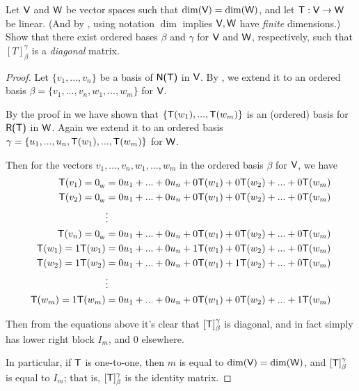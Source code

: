 \begin{exercise} \label{exercise 2.2.17}
Let \(\textsf{V}\) and \(\textsf{W}\) be vector spaces such that \(\dim(\textsf{V}) = \dim(\textsf{W})\), and let \(\textsf{T} : \textsf{V} \to \textsf{W}\) be linear.
(And by , using notation \(\dim\) implies \(\textsf{V}, \textsf{W}\) have \emph{finite} dimensions.)
Show that there exist ordered bases \(\beta\) and \(\gamma\) for
\(\textsf{V}\) and \(\textsf{W}\), respectively, such that \([T]_{\beta}^{\gamma}\) is a \emph{diagonal} matrix.
\end{exercise}

\begin{proof}
Let \(\{ v_1, ..., v_n \}\) be a basis of \(\textsf{N(T)}\) in \(\textsf{V}\).
By , we extend it to an ordered basis \(\beta = \{ v_1, ..., v_n, w_1, ..., w_m \}\) for \(\textsf{V}\).

By the proof in  we have shown that \(\{ \textsf{T}(w_1), ..., \textsf{T}(w_m) \}\) is an (ordered) basis for \(\textsf{R(T)}\) in \(\textsf{W}\).
Again we extend it to an ordered basis \(\gamma = \{ u_1, ..., u_n, \textsf{T}(w_1), ..., \textsf{T}(w_m) \}\) for \(\textsf{W}\).

Then for the vectors \(v_1, ..., v_n, w_1, ..., w_m\) in the ordered basis \(\beta\) for \(\textsf{V}\), we have
\begin{align*}
         \textsf{T}(v_1) = 0_{_{\textsf{W}}} & = 0 u_1 + ... + 0 u_n + 0 \textsf{T}(w_1) + 0 \textsf{T}(w_2) + ... + 0 \textsf{T}(w_m) \\
         \textsf{T}(v_2) = 0_{_{\textsf{W}}} & = 0 u_1 + ... + 0 u_n + 0 \textsf{T}(w_1) + 0 \textsf{T}(w_2) + ... + 0 \textsf{T}(w_m) \\
                       & \vdots \\
         \textsf{T}(v_n) = 0_{_{\textsf{W}}} & = 0 u_1 + ... + 0 u_n + 0 \textsf{T}(w_1) + 0 \textsf{T}(w_2) + ... + 0 \textsf{T}(w_m) \\
    \textsf{T}(w_1) = 1\textsf{T}(w_1) & = 0 u_1 + ... + 0 u_n + 1 \textsf{T}(w_1) + 0 \textsf{T}(w_2) + ... + 0 \textsf{T}(w_m) \\
    \textsf{T}(w_2) = 1\textsf{T}(w_2) & = 0 u_1 + ... + 0 u_n + 0 \textsf{T}(w_1) + 1 \textsf{T}(w_2) + ... + 0 \textsf{T}(w_m) \\
                       & \vdots \\
    \textsf{T}(w_m) = 1\textsf{T}(w_m) & = 0 u_1 + ... + 0 u_n + 0 \textsf{T}(w_1) + 0 \textsf{T}(w_2) + ... + 1 \textsf{T}(w_m) \\
\end{align*}

Then from the equations above it's clear that \([\textsf{T}]_{\beta}^{\gamma}\) is diagonal, and in fact simply has lower right block \(I_m\), and \(0\) elsewhere.

In particular, if \(\textsf{T}\) is one-to-one, then \(m\) is equal to \(\dim(\textsf{V}) = \dim(\textsf{W})\), and \([\textsf{T}]_{\beta}^{\gamma}\) is equal to \(I_m\);
that is, \([\textsf{T}]_{\beta}^{\gamma}\) is the identity matrix.
\end{proof}

